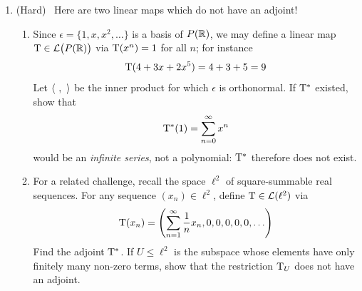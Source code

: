 \begin{exercises}
\begin{enumerate}
				
		\item\label{exs:adjnonexist} (Hard) \ Here are two linear maps which do not have an adjoint!
		\begin{enumerate}
		  \item Since $\epsilon=\{1,x,x^2,\ldots\}$ is a basis of $P(\mathbb{R})$, we may define a linear map $\mathrm{T}\in\mathcal{L}\big(P(\mathbb{R})\big)$ via $\mathrm{T}(x^n)=1$ for all $n$; for instance
			\[
				\mathrm{T}(4+3x+2x^5)=4+3+5=9
			\]
			Let $\left\langle \ ,\ \right\rangle$ be the inner product for which $\epsilon$ is orthonormal. If $\mathrm{T}^*$ existed, show that
			\[
				\mathrm{T}^*(1)=\sum_{n=0}^\infty x^n
			\]
			would be an \emph{infinite series}, not a polynomial: $\mathrm{T}^*$ therefore does not exist.
			
			\item For a related challenge, recall the space $\ell^2$ of square-summable real sequences. For any sequence $(x_n)\in\ell^2$, define $\mathrm{T}\in\mathcal{L}(\ell^2)$ via
			\[
				\mathrm{T}(x_n)=\left(\sum_{n=1}^\infty\frac 1nx_n,0,0,0,0,0,\ldots\right)
			\]
			Find the adjoint $\mathrm{T}^*$. If $U\le\ell^2$ is the subspace whose elements have only finitely many non-zero terms, show that the restriction $\mathrm{T}_{U}$ does not have an adjoint.
		\end{enumerate}
	\end{enumerate}
\end{exercises}


\iffalse


